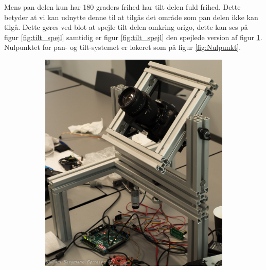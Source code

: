 Mens pan delen kun har 180 graders frihed har tilt delen fuld frihed. Dette betyder at vi kan udnytte denne til at tilgås det område som pan delen ikke kan tilgå. Dette gøres ved blot at spejle tilt delen omkring origo, dette kan ses på figur \ref{fig:tilt_spejl} samtidig er figur \ref{fig:tilt_spejl} den spejlede version af figur \ref{fig:tilt_spejl1}. Nulpunktet for pan- og tilt-systemet er lokeret som på figur \ref{fig:Nulpunkt}. 

\begin{figure}[!h]
    \centering
    \begin{subfigure}[b]{0.3\textwidth}
       \includegraphics[width=1\textwidth]{Billeder/Tilt45deg.jpg}
        \caption{}
        \label{fig:tilt_spejl1}
    \end{subfigure}
  \begin{subfigure}[b]{0.3\textwidth}

\end{subfigure}
\end{figure}
